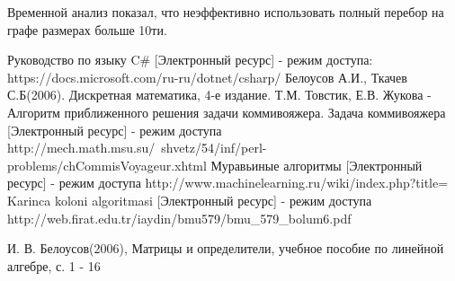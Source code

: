 \documentclass[12pt]{report}
\begin{document}
Временной анализ показал, что неэффективно использовать полный перебор на графе размерах больше 10ти.

 \begin{thebibliography}{3}
Руководство по языку C\# [Электронный ресурс] - режим доступа: https://docs.microsoft.com/ru-ru/dotnet/csharp/
 Белоусов А.И., Ткачев С.Б(2006). Дискретная математика, 4-е издание.
 Т.М. Товстик, Е.В. Жукова - Алгоритм приближенного решения задачи коммивояжера.
 Задача коммивояжера [Электронный ресурс] - режим доступа http://mech.math.msu.su/~shvetz/54/inf/perl-problems/chCommisVoyageur.xhtml
 Муравьиные алгоритмы [Электронный ресурс] - режим доступа http://www.machinelearning.ru/wiki/index.php?title=%
 Karinca koloni algoritmasi [Электронный ресурс] - режим доступа http://web.firat.edu.tr/iaydin/bmu579/bmu_579_bolum6.pdf 

 И. В. Белоусов(2006), Матрицы и определители, учебное пособие   по линейной алгебре, с. 1 - 16
\end{thebibliography}
\end{document}

